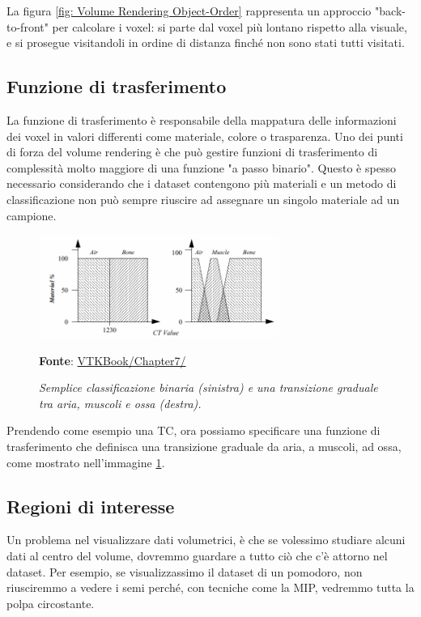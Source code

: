La figura \ref{fig: Volume Rendering Object-Order} rappresenta un approccio "back-to-front" per calcolare i voxel: si parte dal voxel più lontano rispetto alla visuale, e si prosegue visitandoli in ordine di distanza finché non sono stati tutti visitati.

\subsection{Funzione di trasferimento}\label{sec:funzione-trasferimento}
La funzione di trasferimento è responsabile della mappatura delle informazioni dei voxel in valori differenti come materiale, colore o trasparenza. Uno dei punti di forza del volume rendering è che può gestire funzioni di trasferimento di complessità molto maggiore di una funzione "a passo binario". Questo è spesso necessario considerando che i dataset contengono più materiali e un metodo di classificazione non può sempre riuscire ad assegnare un singolo materiale ad un campione.

\begin{figure}[h]
    \centering
    \includegraphics[width=0.7\textwidth]{immagini/volumerendering/functions.png}
    \caption{\textit{Semplice classificazione binaria (sinistra) e una transizione graduale tra aria, muscoli e ossa (destra).}}
    \textbf{Fonte}: \href{https://lorensen.github.io/VTKExamples/site/VTKBook/07Chapter7/}{VTKBook/Chapter7/}
    \label{fig: Funzione di Trasferimento}
\end{figure}

Prendendo come esempio una TC, ora possiamo specificare una funzione di trasferimento che definisca una transizione graduale da aria, a muscoli, ad ossa, come mostrato nell'immagine \ref{fig: Funzione di Trasferimento}.

\subsection{Regioni di interesse}\label{sec:regioni-di-interesse}
Un problema nel visualizzare dati volumetrici, è che se volessimo studiare alcuni dati al centro del volume, dovremmo guardare a tutto ciò che c'è attorno nel dataset. Per esempio, se visualizzassimo il dataset di un pomodoro, non riusciremmo a vedere i semi perché, con tecniche come la MIP, vedremmo tutta la polpa circostante.

